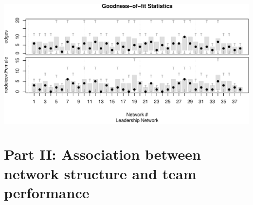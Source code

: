 \documentclass[10pt,ignorenonframetext,aspectratio=169,]{beamer}
\begin{document}
\begin{frame}

\scriptsize

\begin{center}\includegraphics[width=.75\linewidth]{index_files/figure-beamer/preliminary-results-gof-ledership-1} \end{center}

\normalsize

\end{frame}

\hypertarget{part-ii-association-between-network-structure-and-team-performance}{%
\section{Part II: Association between network structure and team
performance}\label{part-ii-association-between-network-structure-and-team-performance}}
\end{document}
